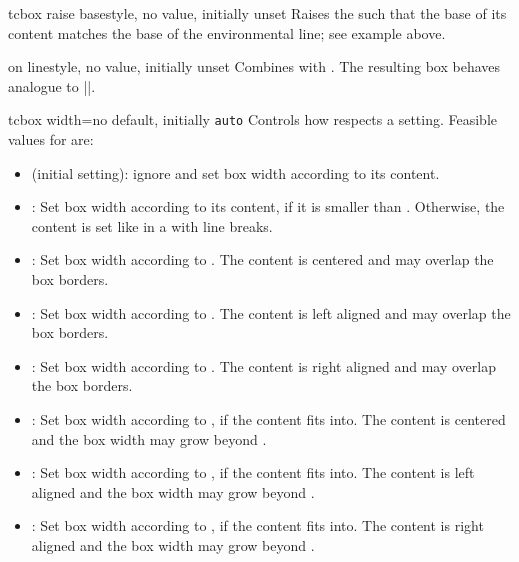 \begin{docTcbKey}{tcbox raise base}{}{style, no value, initially unset}
  Raises the  such that the base of its content matches
  the base of the environmental line; see example above.
\end{docTcbKey}

\begin{docTcbKey}{on line}{}{style, no value, initially unset}
  Combines  with .
  The resulting box behaves analogue to |\fbox|.
\end{docTcbKey}

\clearpage
\begin{docTcbKey}[][doc new=2015-03-23]{tcbox width}{=}{no default, initially \texttt{auto}}
Controls how  respects a  setting.
Feasible values for  are:
\begin{itemize}
\item{} (initial setting):
  ignore  and set box width according to its content.
\item{}:
  Set box width according to its content, if it is smaller than .
  Otherwise, the content is set like in a  with line breaks.
\item{}:
  Set box width according to .
  The content is centered and may overlap the box borders.
\item{}:
  Set box width according to .
  The content is left aligned and may overlap the box borders.
\item{}:
  Set box width according to .
  The content is right aligned and may overlap the box borders.
\item{}:
  Set box width according to , if the content fits into.
  The content is centered and the box width may grow beyond .
\item{}:
  Set box width according to , if the content fits into.
  The content is left aligned and the box width may grow beyond .
\item{}:
  Set box width according to , if the content fits into.
  The content is right aligned and the box width may grow beyond .
\end{itemize}


\end{docTcbKey}
